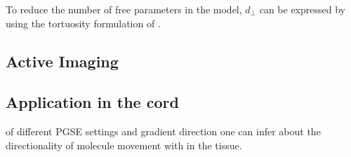 To reduce the number of free parameters in the model, $d_\perp$ can be expressed by using the tortuosity formulation of \citet{Szafer:1995}.

\subsection*{Active Imaging}

\subsection*{Application in the cord}

 of different \gls{PGSE} settings and gradient direction one can infer about the directionality of molecule movement with in the tissue. 

% 
